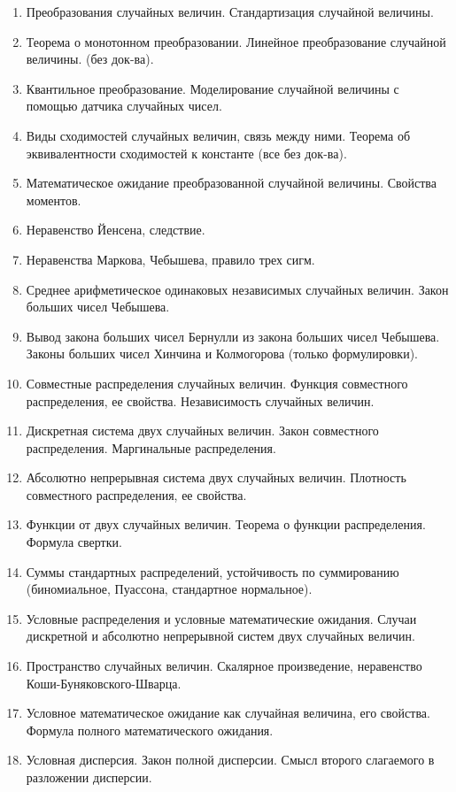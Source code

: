 \begin{enumerate}
    \item Преобразования случайных величин. Стандартизация случайной величины. 
    \item Теорема о монотонном преобразовании. Линейное преобразование случайной величины. (без док-ва).
    \item Квантильное преобразование. Моделирование случайной величины с помощью датчика случайных чисел.
    \item Виды сходимостей случайных величин, связь между ними. Теорема об эквивалентности сходимостей к константе (все без док-ва).
    \item Математическое ожидание преобразованной случайной величины. Свойства моментов.
    \item Неравенство Йенсена, следствие.
    \item Неравенства Маркова, Чебышева, правило трех сигм.
    \item Среднее арифметическое одинаковых независимых случайных величин. Закон больших чисел Чебышева.
    \item Вывод закона больших чисел Бернулли из закона больших чисел Чебышева. Законы больших чисел Хинчина и Колмогорова (только формулировки).
    \item Совместные распределения случайных величин. Функция совместного распределения, ее свойства. Независимость случайных величин.
    \item Дискретная система двух случайных величин. Закон совместного распределения. Маргинальные распределения.
    \item Абсолютно непрерывная система двух случайных величин. Плотность совместного распределения, ее свойства.
    \item Функции от двух случайных величин. Теорема о функции распределения. Формула свертки.
    \item Суммы стандартных распределений, устойчивость по суммированию (биномиальное, Пуассона, стандартное нормальное).
    \item Условные распределения и условные математические ожидания. Случаи дискретной и абсолютно непрерывной систем двух случайных величин.
    \item Пространство случайных величин. Скалярное произведение, неравенство Коши-Буняковского-Шварца. 
    \item Условное математическое ожидание как случайная величина, его свойства. Формула полного математического ожидания.
    \item Условная дисперсия. Закон полной дисперсии. Смысл второго слагаемого в разложении дисперсии.

\end{enumerate}
